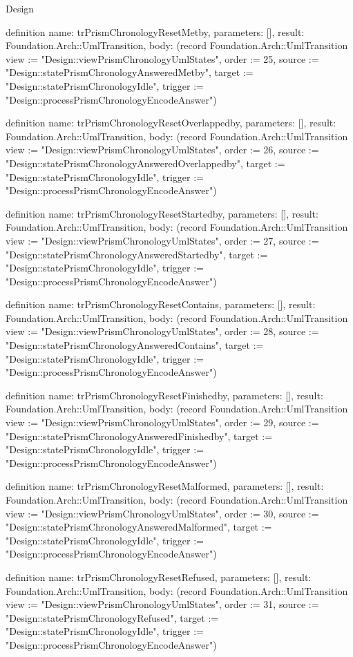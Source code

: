\begin{lexlean}{Design}
\begin{semanticmodule}
definition{
  name: trPrismChronologyResetMetby,
  parameters: [],
  result: Foundation.Arch::UmlTransition,
  body: (record Foundation.Arch::UmlTransition {view := "Design::viewPrismChronologyUmlStates", order := 25, source := "Design::statePrismChronologyAnsweredMetby", target := "Design::statePrismChronologyIdle", trigger := "Design::processPrismChronologyEncodeAnswer"})
}

definition{
  name: trPrismChronologyResetOverlappedby,
  parameters: [],
  result: Foundation.Arch::UmlTransition,
  body: (record Foundation.Arch::UmlTransition {view := "Design::viewPrismChronologyUmlStates", order := 26, source := "Design::statePrismChronologyAnsweredOverlappedby", target := "Design::statePrismChronologyIdle", trigger := "Design::processPrismChronologyEncodeAnswer"})
}

definition{
  name: trPrismChronologyResetStartedby,
  parameters: [],
  result: Foundation.Arch::UmlTransition,
  body: (record Foundation.Arch::UmlTransition {view := "Design::viewPrismChronologyUmlStates", order := 27, source := "Design::statePrismChronologyAnsweredStartedby", target := "Design::statePrismChronologyIdle", trigger := "Design::processPrismChronologyEncodeAnswer"})
}

definition{
  name: trPrismChronologyResetContains,
  parameters: [],
  result: Foundation.Arch::UmlTransition,
  body: (record Foundation.Arch::UmlTransition {view := "Design::viewPrismChronologyUmlStates", order := 28, source := "Design::statePrismChronologyAnsweredContains", target := "Design::statePrismChronologyIdle", trigger := "Design::processPrismChronologyEncodeAnswer"})
}

definition{
  name: trPrismChronologyResetFinishedby,
  parameters: [],
  result: Foundation.Arch::UmlTransition,
  body: (record Foundation.Arch::UmlTransition {view := "Design::viewPrismChronologyUmlStates", order := 29, source := "Design::statePrismChronologyAnsweredFinishedby", target := "Design::statePrismChronologyIdle", trigger := "Design::processPrismChronologyEncodeAnswer"})
}

definition{
  name: trPrismChronologyResetMalformed,
  parameters: [],
  result: Foundation.Arch::UmlTransition,
  body: (record Foundation.Arch::UmlTransition {view := "Design::viewPrismChronologyUmlStates", order := 30, source := "Design::statePrismChronologyAnsweredMalformed", target := "Design::statePrismChronologyIdle", trigger := "Design::processPrismChronologyEncodeAnswer"})
}

definition{
  name: trPrismChronologyResetRefused,
  parameters: [],
  result: Foundation.Arch::UmlTransition,
  body: (record Foundation.Arch::UmlTransition {view := "Design::viewPrismChronologyUmlStates", order := 31, source := "Design::statePrismChronologyRefused", target := "Design::statePrismChronologyIdle", trigger := "Design::processPrismChronologyEncodeAnswer"})
}


\end{semanticmodule}
\end{lexlean}
